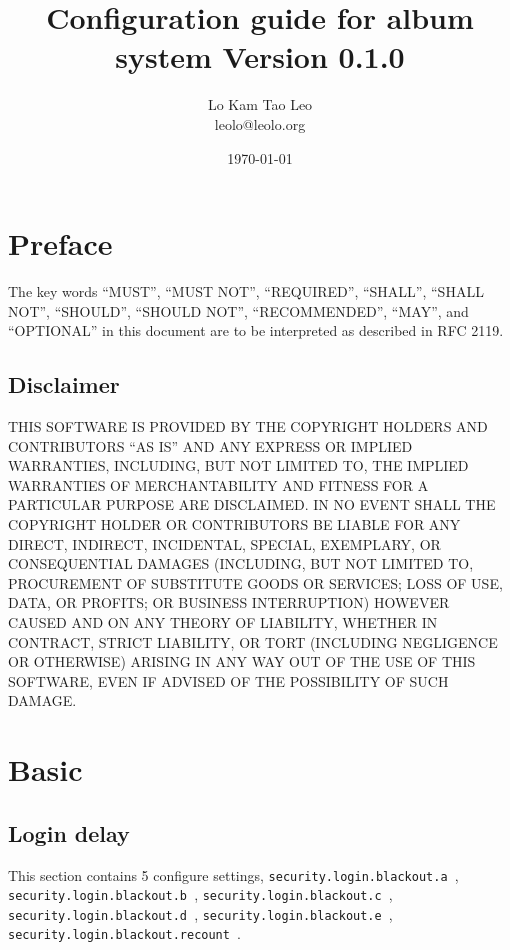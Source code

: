 \documentclass[a4paper,12pt]{report}
\title{Configuration guide for album system Version 0.1.0}
\author{Lo Kam Tao Leo\\leolo@leolo.org}
\date{\today}
\begin{document}
	\maketitle
	\tableofcontents
	\setcounter{chapter}{-1}
	\chapter{Preface}
	The key words ``MUST'', ``MUST NOT'', ``REQUIRED'', ``SHALL'', ``SHALL
	NOT'', ``SHOULD'', ``SHOULD NOT'', ``RECOMMENDED'',  ``MAY'', and
	``OPTIONAL'' in this document are to be interpreted as described in
	RFC 2119.
	\section{Disclaimer}
	THIS SOFTWARE IS PROVIDED BY THE COPYRIGHT HOLDERS AND CONTRIBUTORS ``AS IS''
	AND ANY EXPRESS OR IMPLIED WARRANTIES, INCLUDING, BUT NOT LIMITED TO, THE
	IMPLIED WARRANTIES OF MERCHANTABILITY AND FITNESS FOR A PARTICULAR PURPOSE ARE
	DISCLAIMED. IN NO EVENT SHALL THE COPYRIGHT HOLDER OR CONTRIBUTORS BE LIABLE
	FOR ANY DIRECT, INDIRECT, INCIDENTAL, SPECIAL, EXEMPLARY, OR CONSEQUENTIAL
	DAMAGES (INCLUDING, BUT NOT LIMITED TO, PROCUREMENT OF SUBSTITUTE GOODS OR
	SERVICES; LOSS OF USE, DATA, OR PROFITS; OR BUSINESS INTERRUPTION) HOWEVER
	CAUSED AND ON ANY THEORY OF LIABILITY, WHETHER IN CONTRACT, STRICT LIABILITY,
	OR TORT (INCLUDING NEGLIGENCE OR OTHERWISE) ARISING IN ANY WAY OUT OF THE USE
	OF THIS SOFTWARE, EVEN IF ADVISED OF THE POSSIBILITY OF SUCH DAMAGE.
	\chapter{Basic}
	\section{Login delay}
	This section contains 5 configure settings, \texttt{security.login.blackout.a }, \texttt{security.login.blackout.b }, \texttt{security.login.blackout.c }, \texttt{security.login.blackout.d }, \texttt{security.login.blackout.e }, \texttt{security.login.blackout.recount }.
	
\end{document}

